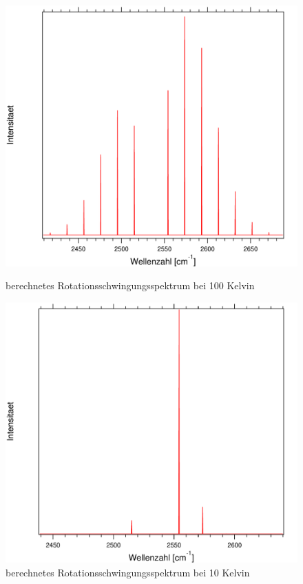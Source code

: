 \begin{figure}[H]
	
	\begin{minipage}{0.5\textwidth}
	\includegraphics[width=\textwidth]{Bilder/100HCl.pdf}
	\caption{berechnetes Rotationsschwingungsspektrum bei 100 Kelvin}
	\label{Rot:100HCl}
	\end{minipage}
\begin{minipage}{0.5\textwidth}
	\includegraphics[width=\textwidth]{Bilder/10HCl.pdf}
	\caption{berechnetes Rotationsschwingungsspektrum bei 10 Kelvin}
	\label{Rot:10HCl}
	\end{minipage}	
	
		
	
\end{figure}

